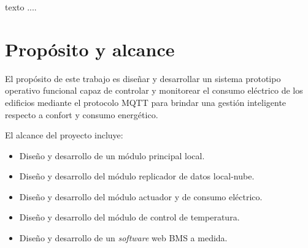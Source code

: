 texto ....





\section{Propósito y alcance}




El propósito de este trabajo es diseñar y desarrollar un sistema prototipo operativo funcional capaz de controlar y monitorear el consumo eléctrico de los  edificios mediante el protocolo MQTT para brindar una gestión inteligente respecto a confort y consumo energético.


El alcance del proyecto incluye:
\begin{itemize}
\item Diseño y desarrollo de un módulo principal local.
\item Diseño y desarrollo del módulo replicador de datos local-nube.
\item Diseño y desarrollo del módulo actuador y de consumo eléctrico.
\item Diseño y desarrollo del módulo de control de temperatura.
\item Diseño y desarrollo de un \emph{software} web BMS a medida.
\end{itemize}


\let\cleardoublepage\clearpage %